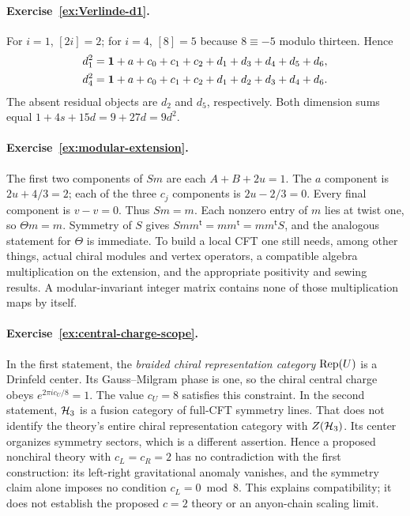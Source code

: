 \paragraph{Exercise~\ref{ex:Verlinde-d1}.}
\label{sol:ex:Verlinde-d1}
For $i=1$, $[2i]=2$; for $i=4$, $[8]=5$ because $8\equiv-5$
modulo thirteen. Hence
\begin{align*}
 d_1^2&=\mathbf1+a+c_0+c_1+c_2+d_1+d_3+d_4+d_5+d_6,\\
 d_4^2&=\mathbf1+a+c_0+c_1+c_2+d_1+d_2+d_3+d_4+d_6.
\end{align*}
The absent residual objects are $d_2$ and $d_5$, respectively.
Both dimension sums equal
$1+4s+15d=9+27d=9d^2$.



\paragraph{Exercise~\ref{ex:modular-extension}.}
\label{sol:ex:modular-extension}
The first two components of $Sm$ are each $A+B+2u=1$.
The $a$ component is $2u+4/3=2$; each of the three $c_j$
components is $2u-2/3=0$.  Every final component is $v-v=0$.
Thus $Sm=m$.  Each nonzero entry of $m$ lies at twist one, so
$\Theta m=m$.  Symmetry of $S$ gives
$Smm^{\mathsf t}=mm^{\mathsf t}=mm^{\mathsf t}S$, and
the analogous statement for $\Theta$ is immediate.
To build a local CFT one still needs, among other things, actual
chiral modules and vertex operators, a compatible algebra
multiplication on the extension, and the appropriate positivity
and sewing results.  A modular-invariant integer matrix contains
none of those multiplication maps by itself.



\paragraph{Exercise~\ref{ex:central-charge-scope}.}
\label{sol:ex:central-charge-scope}
In the first statement, the \emph{braided chiral representation
category} $\operatorname{Rep}(U)$ is a Drinfeld center. Its Gauss--Milgram phase
is one, so the chiral central charge obeys
$e^{2\pi ic_U/8}=1$. The value $c_U=8$ satisfies this constraint.
In the second statement, $\mathcal H_3$ is a fusion category of full-CFT
symmetry lines. That does not identify the theory's entire chiral
representation category with $Z(\mathcal H_3)$. Its center organizes
symmetry sectors, which is a different assertion. Hence a proposed
nonchiral theory with $c_L=c_R=2$ has no contradiction with the
first construction: its left-right gravitational anomaly vanishes,
and the symmetry claim alone imposes no condition $c_L=0\bmod8$.
This explains compatibility; it does not establish the proposed
$c=2$ theory or an anyon-chain scaling limit.


